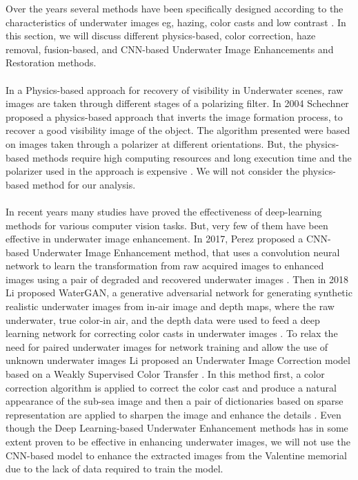 \documentclass[a4paper,11pt,oneside]{article}
\begin{document}
  Over the years several methods have been specifically designed according to the characteristics of underwater images eg, hazing, color casts and low contrast \cite{15}. In this section, we will discuss different physics-based, color correction, haze removal, fusion-based, and CNN-based Underwater Image Enhancements and Restoration methods.\\
  \\
  In a Physics-based approach for recovery of visibility in Underwater scenes, raw images are taken through different stages of a polarizing filter. In 2004 Schechner \cite{19} proposed a physics-based approach that inverts the image formation process, to recover a good visibility image of the object. The algorithm presented were based on images taken through a polarizer at different orientations. But, the physics-based methods require high computing resources and long execution time and the polarizer used in the approach is expensive \cite{8}. We will not consider the physics-based method for our analysis.\\
  \\
  In recent years many studies have proved the effectiveness of deep-learning methods for various computer vision tasks. But, very few of them have been effective in underwater image enhancement. In 2017, Perez \cite{22} proposed a CNN-based Underwater Image Enhancement method, that uses a convolution neural network to learn the transformation from raw acquired images to enhanced images using a pair of degraded and recovered underwater images \cite{15}. Then in 2018 Li \cite{23} proposed WaterGAN, a generative adversarial network for generating synthetic realistic underwater images from in-air image and depth maps, where the raw underwater, true color-in air, and the depth data were used to feed a deep learning network for correcting color casts in underwater images \cite{15}. To relax the need for paired underwater images for network training and allow the use of unknown underwater images Li \cite{7} proposed an Underwater Image Correction model based on a Weakly Supervised Color Transfer \cite{15}. In this method first, a color correction algorithm is applied to correct the color cast and produce a natural appearance of the sub-sea image and then a pair of dictionaries based on sparse representation are applied to sharpen the image and enhance the details \cite{7}. Even though the Deep Learning-based Underwater Enhancement methods has in some extent proven to be effective in enhancing underwater images, we will not use the CNN-based model to enhance the extracted images from the Valentine memorial due to the lack of data required to train the model.\\
\end{document}

